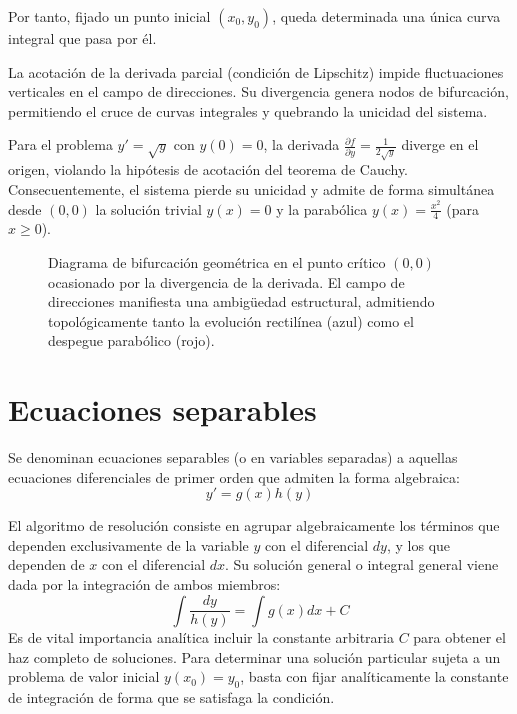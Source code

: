 Por tanto, fijado un punto inicial $(x_0,y_0)$, queda determinada una única curva integral que pasa por él.

\begin{observacion}
La acotación de la derivada parcial (condición de Lipschitz) impide fluctuaciones verticales en el campo de direcciones. Su divergencia genera nodos de bifurcación, permitiendo el cruce de curvas integrales y quebrando la unicidad del sistema.
\end{observacion}

\begin{ejemplo}
Para el problema $y' = \sqrt{y}$ con $y(0) = 0$, la derivada $\frac{\partial f}{\partial y} = \frac{1}{2\sqrt{y}}$ diverge en el origen, violando la hipótesis de acotación del teorema de Cauchy. Consecuentemente, el sistema pierde su unicidad y admite de forma simultánea desde $(0,0)$ la solución trivial $y(x) = 0$ y la parabólica $y(x) = \frac{x^2}{4}$ (para $x \geq 0$).

\begin{figure}[H]
    \centering
    
    \caption{Diagrama de bifurcación geométrica en el punto crítico $(0,0)$ ocasionado por la divergencia de la derivada. El campo de direcciones manifiesta una ambigüedad estructural, admitiendo topológicamente tanto la evolución rectilínea (azul) como el despegue parabólico (rojo).}
\end{figure}
\end{ejemplo}
\newpage

\section{Ecuaciones separables}

Se denominan ecuaciones separables (o en variables separadas) a aquellas ecuaciones diferenciales de primer orden que admiten la forma algebraica:
$$ y' = g(x)h(y) $$

El algoritmo de resolución consiste en agrupar algebraicamente los términos que dependen exclusivamente de la variable $y$ con el diferencial $dy$, y los que dependen de $x$ con el diferencial $dx$. Su solución general o integral general viene dada por la integración de ambos miembros:
$$ \int \frac{dy}{h(y)} = \int g(x)dx + C $$
Es de vital importancia analítica incluir la constante arbitraria $C$ para obtener el haz completo de soluciones. Para determinar una solución particular sujeta a un problema de valor inicial $y(x_0) = y_0$, basta con fijar analíticamente la constante de integración de forma que se satisfaga la condición.

